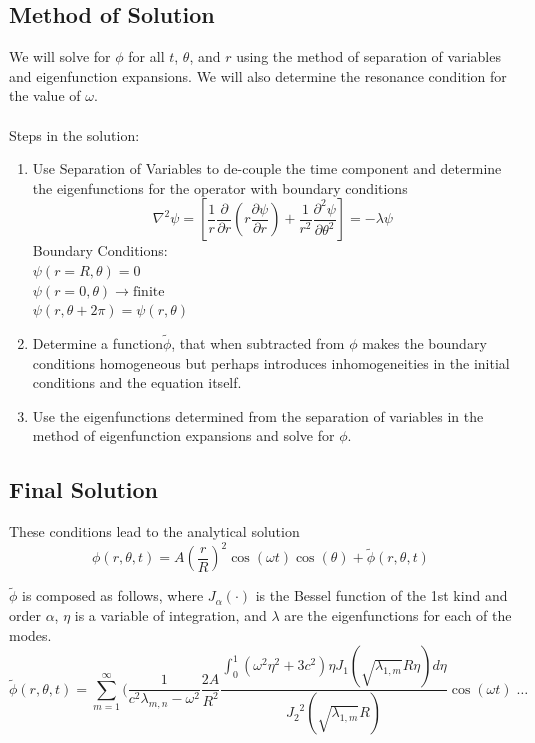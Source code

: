 \documentclass{homework}
\begin{document}
\subsection{Method of Solution}
We will solve for $\phi$ for all $t$, $\theta$, and $r$ using the method of separation of variables and eigenfunction expansions. We will also determine the resonance condition for the value of $\omega$. 
\\ \\
\noindent Steps in the solution:
\begin{enumerate}
    \item Use Separation of Variables to de-couple the time component and determine the eigenfunctions for the operator with boundary conditions
    \[ \nabla^2 \psi = \left[ \frac{1}{r} \frac{\partial}{\partial r} \left(r \frac{\partial \psi}{\partial r}\right) + \frac{1}{r^2} \frac{\partial^2 \psi}{\partial \theta^2} \right] = - \lambda \psi \]
    \noindent Boundary Conditions: \\
    $ \psi(r=R, \theta) = 0 $ \\
    $ \psi(r=0, \theta) \rightarrow \textrm{finite} $ \\
    $ \psi(r, \theta + 2\pi) = \psi(r, \theta) $ \\
    \item Determine a function$\tilde{\phi}$, that when subtracted from $\phi$ makes the boundary conditions homogeneous but perhaps introduces inhomogeneities in the initial conditions and the equation itself.
    \item Use the eigenfunctions determined from the separation of variables in the method of eigenfunction expansions and solve for $\phi$.
\end{enumerate} 

\newpage
\subsection{Final Solution}
\noindent These conditions lead to the analytical solution 
$$ \phi(r, \theta, t) = A \left(\frac{r}{R} \right)^2 \cos(\omega t) \cos(\theta) + \tilde{\phi} (r, \theta, t)$$ 

\noindent $\tilde{\phi}$ is composed as follows, where $J_\alpha (\cdot)$ is the Bessel function of the 1st kind and order $\alpha$, $\eta$ is a variable of integration, and $\lambda$ are the eigenfunctions for each of the modes.
$$ \tilde{\phi} (r, \theta, t) = \sum_{m=1}^\infty \Biggl( \frac{1}{c^2 \lambda_{m,n} - \omega^2} \frac{2A}{R^2} \frac{\int_0^1 \left( \omega^2 \eta^2 + 3c^2 \right) \eta J_1\left( \sqrt{\lambda_{1,m}} R \eta \right) d\eta }{{J_2}^2 \left( \sqrt{\lambda_{1,m}} R \right)} \cos(\omega t) \; \dots $$
\end{document}

